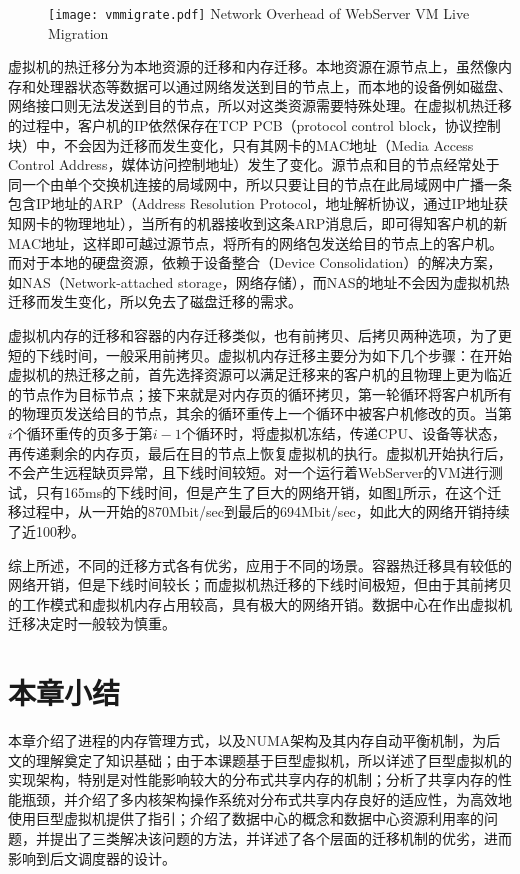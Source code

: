 \begin{figure}[!htp]
  \centering
  \texttt{[image: vmmigrate.pdf]}
    {Network Overhead of WebServer VM Live Migration}
  \label{fig:livem}
\end{figure}

虚拟机的热迁移\cite{livemigration}分为本地资源的迁移和内存迁移。本地资源在源节点上，虽然像内存和处理器状态等数据可以通过网络发送到目的节点上，而本地的设备例如磁盘、网络接口则无法发送到目的节点，所以对这类资源需要特殊处理。在虚拟机热迁移的过程中，客户机的IP依然保存在TCP PCB（protocol control block，协议控制块）中，不会因为迁移而发生变化，只有其网卡的MAC地址（Media Access Control Address，媒体访问控制地址）发生了变化。源节点和目的节点经常处于同一个由单个交换机连接的局域网中，所以只要让目的节点在此局域网中广播一条包含IP地址的ARP（Address Resolution Protocol，地址解析协议，通过IP地址获知网卡的物理地址），当所有的机器接收到这条ARP消息后，即可得知客户机的新MAC地址，这样即可越过源节点，将所有的网络包发送给目的节点上的客户机。而对于本地的硬盘资源，依赖于设备整合（Device Consolidation）的解决方案，如NAS（Network-attached storage，网络存储），而NAS的地址不会因为虚拟机热迁移而发生变化，所以免去了磁盘迁移的需求。

虚拟机内存的迁移和容器的内存迁移类似，也有前拷贝、后拷贝两种选项，为了更短的下线时间，一般采用前拷贝。虚拟机内存迁移主要分为如下几个步骤：在开始虚拟机的热迁移之前，首先选择资源可以满足迁移来的客户机的且物理上更为临近的节点作为目标节点；接下来就是对内存页的循环拷贝，第一轮循环将客户机所有的物理页发送给目的节点，其余的循环重传上一个循环中被客户机修改的页。当第$i$个循环重传的页多于第$i-1$个循环时，将虚拟机冻结，传递CPU、设备等状态，再传递剩余的内存页，最后在目的节点上恢复虚拟机的执行。虚拟机开始执行后，不会产生远程缺页异常，且下线时间较短。对一个运行着WebServer的VM进行测试，只有165ms的下线时间，但是产生了巨大的网络开销，如图\ref{fig:livem}所示，在这个迁移过程中，从一开始的870Mbit/sec到最后的694Mbit/sec，如此大的网络开销持续了近100秒\cite{livemigration}。

综上所述，不同的迁移方式各有优劣，应用于不同的场景。容器热迁移具有较低的网络开销，但是下线时间较长；而虚拟机热迁移的下线时间极短，但由于其前拷贝的工作模式和虚拟机内存占用较高，具有极大的网络开销。数据中心在作出虚拟机迁移决定时一般较为慎重。

\section{本章小结}
本章介绍了进程的内存管理方式，以及NUMA架构及其内存自动平衡机制，为后文的理解奠定了知识基础；由于本课题基于巨型虚拟机，所以详述了巨型虚拟机的实现架构，特别是对性能影响较大的分布式共享内存的机制；分析了共享内存的性能瓶颈，并介绍了多内核架构操作系统对分布式共享内存良好的适应性，为高效地使用巨型虚拟机提供了指引；介绍了数据中心的概念和数据中心资源利用率的问题，并提出了三类解决该问题的方法，并详述了各个层面的迁移机制的优劣，进而影响到后文调度器的设计。